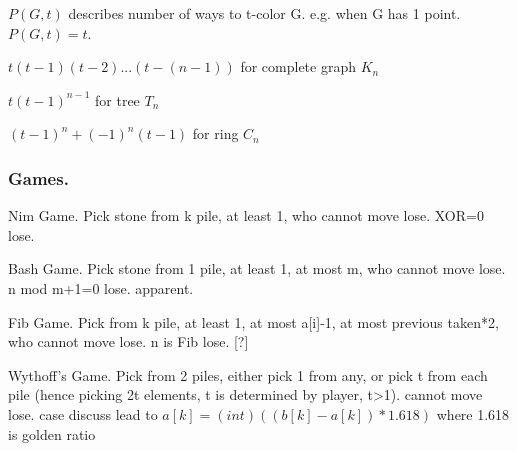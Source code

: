 \begin{tmindent}
  $P(G, t)$ describes number of ways to t-color G. e.g. when G has 1 point. $P(G, t) = t$.

  $t(t-1)(t-2)...(t-(n-1))$ for complete graph $K_n$

  $t(t-1)^{n-1}$ for tree $T_n$

  $(t-1)^n+(-1)^n(t-1)$ for ring $C_n$
  
\end{tmindent}




\subsubsection{Games.}
\begin{tmindent}
  Nim Game. Pick stone from k pile, at least 1, who cannot move lose. 
  XOR=0 lose.

  Bash Game. Pick stone from 1 pile, at least 1, at most m, who cannot move lose.
  n mod m+1=0 lose. apparent.

  Fib Game. Pick from k pile, at least 1, at most a[i]-1, at most previous taken*2, who cannot move lose.
  n is Fib lose. [?]

  Wythoff's Game. Pick from 2 piles, either pick 1 from any, or pick t from each pile (hence picking 2t elements, t is determined by player, t>1). cannot move lose.
  case discuss lead to $a[k] = (int)((b[k] - a[k]) * 1.618)$ where 1.618 is golden ratio
    
\end{tmindent}